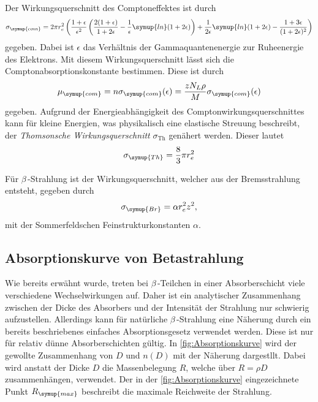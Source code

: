 Der Wirkungsquerschnitt des Comptoneffektes ist durch
\begin{equation}
    \label{eqn:sigma_com}
    \sigma_{\symup{com}} = 2\pi r_{e}^2\left(\frac{1 + \epsilon}{\epsilon^2}\left( \frac{2(1+\epsilon)}{1+2\epsilon} - \frac{1}{\epsilon}\symup{ln}(1+2\epsilon)\right)+\frac{1}{2\epsilon}\symup{ln}(1+2\epsilon) - \frac{1 + 3\epsilon}{(1+2\epsilon)^2}\right)
\end{equation}
gegeben. Dabei ist $\epsilon$ das Verhältnis der Gammaquantenenergie zur Ruheenergie des Elektrons. Mit diesem Wirkungsquerschnitt lässt sich die Comptonabsorptionskonstante 
bestimmen. Diese ist durch 
\begin{equation}
    \label{eqn:mu_com}
    \mu_{\symup{com}} = n\sigma_{\symup{com}}(\epsilon) = \frac{zN_L\rho}{M}\sigma_{\symup{com}}(\epsilon)
\end{equation}
gegeben. Aufgrund der Energieabhängigkeit des Comptonwirkungsquerschnittes kann für kleine Energien, was physikalisch eine elastische Streuung beschreibt, der 
\textit{Thomsonsche Wirkungsquerschnitt} $\sigma_\text{Th}$ genähert werden. Dieser lautet 
\begin{equation}
    \sigma_{\symup{Th}} = \frac{8}{3}\pi r_e^2
\end{equation}

Für $\beta$\,-Strahlung ist der Wirkungsquerschnitt, welcher aus der Bremsstrahlung entsteht, gegeben durch 
\begin{equation}
    \label{eqn:sigma_br}
    \sigma_{\symup{Br}} = \alpha r_e^2z^2,
\end{equation}
mit der Sommerfeldschen Feinstrukturkonstanten $\alpha$.

\subsection{Absorptionskurve von Betastrahlung}
\label{subsec:Absorptionskurve}
Wie bereits erwähnt wurde, treten bei $\beta$\,-Teilchen in einer Absorberschicht viele verschiedene Wechselwirkungen auf. Daher ist ein analytischer Zusammenhang zwischen 
der Dicke des Absorbers und der Intensität der Strahlung nur schwierig aufzustellen. Allerdings kann für natürliche  $\beta$\,-Strahlung eine Näherung durch ein bereits 
beschriebenes einfaches Absorptionsgesetz verwendet werden. Diese ist nur für relativ dünne Absorberschichten gültig. In \autoref{fig:Absorptionskurve} wird der
gewollte Zusammenhang von $D$ und $n(D)$ mit der Näherung dargestllt. Dabei wird anstatt der Dicke $D$ die Massenbelegung $R$, welche über $R = \rho D$ zusammenhängen, verwendet.
Der in der \autoref{fig:Absorptionskurve} eingezeichnete Punkt $R_{\symup{max}}$ beschreibt die maximale Reichweite der Strahlung.

